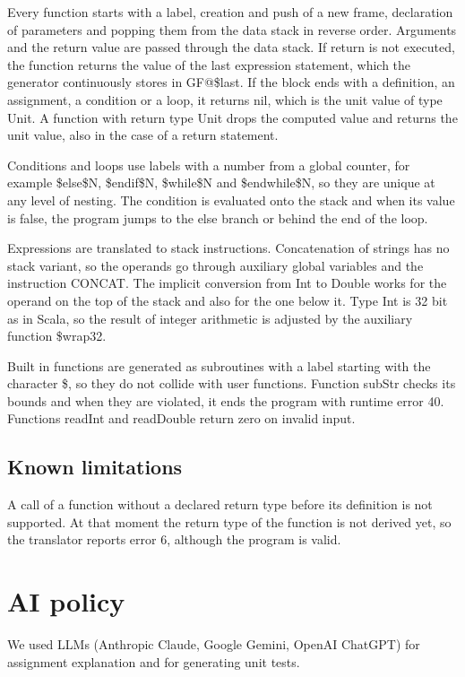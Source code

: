 \documentclass[a4paper,11pt]{article}
\begin{document}
Every function starts with a label, creation and push of a new frame, declaration of
parameters and popping them from the data stack in reverse order. Arguments and the return
value are passed through the data stack. If return is not executed, the function
returns the value of the last expression statement, which the generator continuously
stores in GF@\$last. If the block ends with a definition, an assignment, a
condition or a loop, it returns nil, which is the unit value of type
Unit. A function with return type Unit drops the computed value and
returns the unit value, also in the case of a return statement.

Conditions and loops use labels with a number from a global counter, for example
\$else\$N, \$endif\$N, \$while\$N and
\$endwhile\$N, so they are unique at any level of nesting. The condition is
evaluated onto the stack and when its value is false, the program jumps to the
else branch or behind the end of the loop.

Expressions are translated to stack instructions. Concatenation of strings has no stack
variant, so the operands go through auxiliary global variables and the instruction
CONCAT. The implicit conversion from Int to Double works for the
operand on the top of the stack and also for the one below it. Type Int is 32 bit
as in Scala, so the result of integer arithmetic is adjusted by the auxiliary function
\$wrap32.

Built in functions are generated as subroutines with a label starting with the character
\$, so they do not collide with user functions. Function subStr checks
its bounds and when they are violated, it ends the program with runtime error 40.
Functions readInt and readDouble return zero on invalid input.

\subsection{Known limitations}

A call of a function without a declared return type before its definition is not
supported. At that moment the return type of the function is not derived yet, so the
translator reports error 6, although the program is valid.

\section{AI policy}

We used LLMs (Anthropic Claude, Google Gemini, OpenAI ChatGPT) for assignment explanation
and for generating unit tests.
\end{document}
